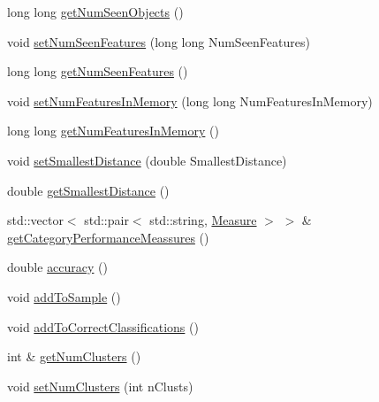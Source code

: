 \begin{DoxyCompactItemize}
long long \hyperlink{class_test_result_a2fc8d3dc661c79d6432ea5724f0a27f1}{get\+Num\+Seen\+Objects} ()
\item 
void \hyperlink{class_test_result_a3b62eac13ac36a12454ced117e6eebe3}{set\+Num\+Seen\+Features} (long long Num\+Seen\+Features)
\item 
long long \hyperlink{class_test_result_af31d71d5f3a86aabc5004e725b1c467c}{get\+Num\+Seen\+Features} ()
\item 
void \hyperlink{class_test_result_a834d5e72053690b3c695a939f969b21f}{set\+Num\+Features\+In\+Memory} (long long Num\+Features\+In\+Memory)
\item 
long long \hyperlink{class_test_result_a9ccd5cc0a7dd562015d8030d565dda8b}{get\+Num\+Features\+In\+Memory} ()
\item 
void \hyperlink{class_test_result_a81a7c2e2b80e316df3f5ad9a8144a454}{set\+Smallest\+Distance} (double Smallest\+Distance)
\item 
double \hyperlink{class_test_result_a592c4856a78c354fa97029c526eaa306}{get\+Smallest\+Distance} ()
\item 
std\+::vector$<$ std\+::pair$<$ std\+::string, \hyperlink{class_measure}{Measure} $>$ $>$ \& \hyperlink{class_test_result_a4bb4cc060985ad8a8b8bc12266daffd2}{get\+Category\+Performance\+Meassures} ()
\item 
double \hyperlink{class_test_result_acf90ffd2fa4e6d459ee75747ea07cc93}{accuracy} ()
\item 
void \hyperlink{class_test_result_a52297b1ef46add85147456a8011991a4}{add\+To\+Sample} ()
\item 
void \hyperlink{class_test_result_a4a46aaf2d355f73c2fd366945ed46496}{add\+To\+Correct\+Classifications} ()
\item 
int \& \hyperlink{class_test_result_a6063b616fe294b8cee9efa1739958d04}{get\+Num\+Clusters} ()
\item 
void \hyperlink{class_test_result_acf1bc1c422b1edfd53b9c7cf11980aca}{set\+Num\+Clusters} (int n\+Clusts)
\end{DoxyCompactItemize}
